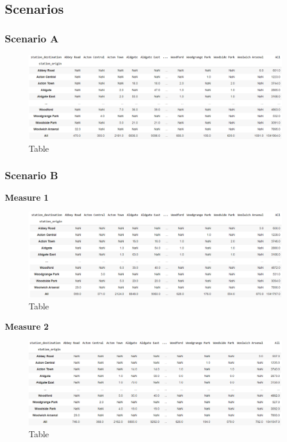 \documentclass[10pt]{report}
\numberwithin{figure}{section}
\numberwithin{table}{section}
\begin{document}
\subsection{Scenarios}
\subsubsection{Scenario A}

    \begin{figure}[htp]
        \centering
        \includegraphics[width=16cm]{Image/Part2_OD4_scenario A.png}
        \caption{Table}
        \label{fig:Part2_OD4_scenario A}
    \end{figure}

\newpage    

\subsubsection{Scenario B}

\textbf{Measure 1}

    \begin{figure}[htp]
        \centering
        \includegraphics[width=16cm]{Image/Part2_OD6_scenario B.png}
        \caption{Table}
        \label{fig:Part2_OD6_scenario B}
    \end{figure}

\textbf{Measure 2}    


    \begin{figure}[htp]
        \centering
        \includegraphics[width=16cm]{Image/Part2_OD8_scenario B.png}
        \caption{Table}
        \label{fig:Part2_OD8_scenario B}
    \end{figure}
\end{document}
